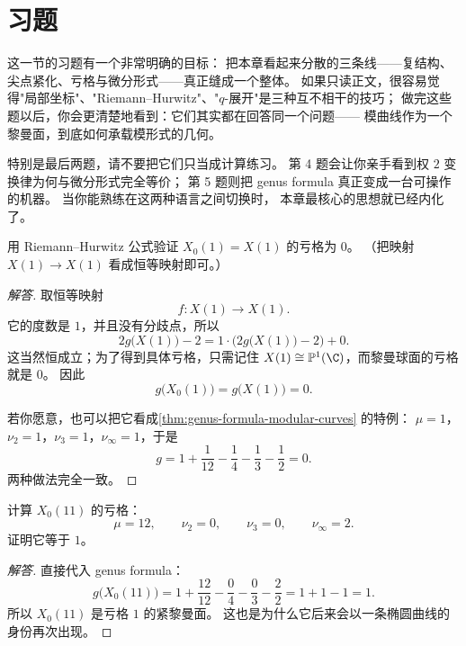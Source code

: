 \section{习题}
\label{sec:ch02-exercises}

这一节的习题有一个非常明确的目标：
把本章看起来分散的三条线——复结构、尖点紧化、亏格与微分形式——真正缝成一个整体。
如果只读正文，很容易觉得"局部坐标"、"Riemann--Hurwitz"、"$q$-展开"是三种互不相干的技巧；
做完这些题以后，你会更清楚地看到：它们其实都在回答同一个问题——
模曲线作为一个黎曼面，到底如何承载模形式的几何。

特别是最后两题，请不要把它们只当成计算练习。
第 4 题会让你亲手看到权 $2$ 变换律为何与微分形式完全等价；
第 5 题则把 genus formula 真正变成一台可操作的机器。
当你能熟练在这两种语言之间切换时，
本章最核心的思想就已经内化了。

\begin{exercise}
\label{ex:ch02-x01-genus0}
用 Riemann--Hurwitz 公式验证 $X_0(1)=X(1)$ 的亏格为 $0$。
（把映射 $X(1)\to X(1)$ 看成恒等映射即可。）
\end{exercise}

\begin{proof}[解答]
取恒等映射
\[
  f\colon X(1)\longrightarrow X(1).
\]
它的度数是 $1$，并且没有分歧点，所以
\[
  2g\bigl(X(1)\bigr)-2=1\cdot\bigl(2g\bigl(X(1)\bigr)-2\bigr)+0.
\]
这当然恒成立；为了得到具体亏格，只需记住
$X(1)\cong\mathbb{P}^1(\C)$，而黎曼球面的亏格就是 $0$。
因此
\[
  g\bigl(X_0(1)\bigr)=g\bigl(X(1)\bigr)=0.
\]

若你愿意，也可以把它看成\cref{thm:genus-formula-modular-curves} 的特例：
$\mu=1$，$\nu_2=1$，$\nu_3=1$，$\nu_\infty=1$，于是
\[
  g=1+\frac1{12}-\frac14-\frac13-\frac12=0.
\]
两种做法完全一致。
\end{proof}

\begin{exercise}
\label{ex:ch02-x011-genus1}
计算 $X_0(11)$ 的亏格：
\[
  \mu=12,\qquad \nu_2=0,\qquad \nu_3=0,\qquad \nu_\infty=2.
\]
证明它等于 $1$。
\end{exercise}

\begin{proof}[解答]
直接代入 genus formula：
\[
  g\bigl(X_0(11)\bigr)
  =1+\frac{12}{12}-\frac{0}{4}-\frac{0}{3}-\frac{2}{2}
  =1+1-1=1.
\]
所以 $X_0(11)$ 是亏格 $1$ 的紧黎曼面。
这也是为什么它后来会以一条椭圆曲线的身份再次出现。
\end{proof}

